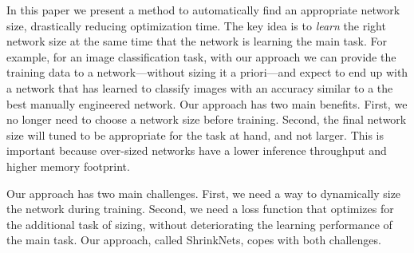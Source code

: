 \documentclass[sigconf]{acmart}
\newcommand{\gl}[1]{\textcolor{violet}{{\bf Gl:} #1}}
\begin{document}
In this paper we present a method to automatically find an appropriate network
size,
drastically reducing optimization time.
The key idea is to
\emph{learn} the right network size at the same time that the network is
learning the main task. For example, for an image classification task, with our
approach we can provide the training data to a network---without sizing it a
priori---and expect to end up with a network that has learned to classify images
with an accuracy similar to a the best manually engineered network.
Our approach has two main benefits. First, we no longer need to choose a
network size before training. Second, the final network size will tuned to be
appropriate for the task at hand, and not larger. 
This is important
because over-sized networks have a lower inference throughput and higher memory
footprint.

Our approach has two main challenges. First, we need a way to dynamically size the
network during training. Second, we need a loss function that optimizes
for the additional task of sizing, without deteriorating the learning
performance of the main task. Our approach, called ShrinkNets, copes with both
challenges.

% 
% 
\end{document}
